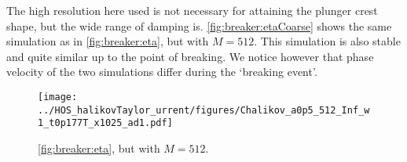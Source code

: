 \documentclass[a4paper,12pt]{article}
\renewcommand{\_}[1]{_\mr{#1}}
\begin{document}
The high resolution here used is not necessary for attaining the plunger crest shape, but the wide range of damping is.
\autoref{fig:breaker:etaCoarse} shows the same simulation as in \autoref{fig:breaker:eta}, but with $M=512$.
This simulation is also stable and quite similar up to the point of breaking. We notice however that phase velocity of the two simulations differ during the `breaking event'.
\begin{figure}[h!ptb]%
\centering
\texttt{[image: ../HOS\_ChalikovTaylor\_current/figures/Chalikov\_ka0p5\_M512\_hInf\_Nw1\_dt0p177T\_nx1025\_pad1.pdf]}%
\caption{\autoref{fig:breaker:eta}, but with $M=512$.}%
\label{fig:breaker:etaCoarse}%
\end{figure}




\end{document}
